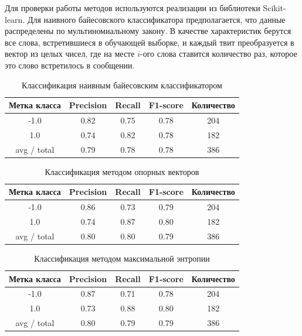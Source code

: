 Для проверки работы методов используются реализации из библиотеки
Scikit-learn\cite{scikit-learn}. Для наивного байесовского классификатора предполагается, что данные
распределены по мультиномиальному закону.
В качестве характеристик берутся все слова, встретившиеся в обучающей выборке,
и каждый твит преобразуется в вектор из целых чисел, где
на месте $i$-ого слова ставится количество раз, которое это слово встретилось в сообщении.

\begin{table}[h]
    \centering
    \begin{tabular}{|c|c|c|c|c|}
      \hline
      \textbf{Метка класса} & \textbf{Precision} & \textbf{Recall} & \textbf{F1-score} &
      \textbf{Количество} \\ \hline
      -1.0&0.82&0.75&0.78&204\\ \hline
      1.0&0.74&0.82&0.78&182\\ \hline \hline
      avg / total&0.79&0.78&0.78&386\\
      \hline
    \end{tabular}
    \caption{Классификация наивным байесовским классификатором}\label{tab:nb}
\end{table}
\begin{table}[h!]
    \centering
    \begin{tabular}{|c|c|c|c|c|}
      \hline
      \textbf{Метка класса} & \textbf{Precision} & \textbf{Recall} & \textbf{F1-score} &
      \textbf{Количество} \\ \hline
      -1.0&0.86&0.73&0.79&204\\ \hline
      1.0&0.74&0.87&0.80&182\\ \hline \hline
      avg / total&0.80&0.80&0.79&386\\
      \hline
    \end{tabular}
    \caption{Классификация методом опорных векторов}\label{tab:svm}
\end{table}
\begin{table}[h!]
  \centering
    \begin{tabular}{|c|c|c|c|c|}
      \hline
      \textbf{Метка класса} & \textbf{Precision} & \textbf{Recall} & \textbf{F1-score} & \textbf{Количество} \\ \hline
      -1.0&0.87&0.71&0.78&204\\ \hline
      1.0&0.73&0.88&0.80&182\\ \hline \hline
      avg / total&0.80&0.79&0.79&386\\
      \hline
    \end{tabular}
    \caption{Классификация методом максимальной энтропии}\label{tab:maxent}
\end{table}

